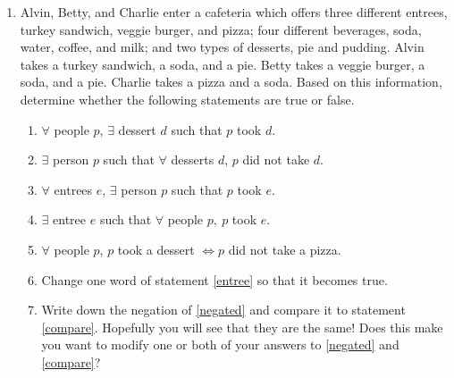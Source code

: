 \begin{enumerate}
\wbvfill

\workbookpagebreak

\item  Alvin, Betty, and Charlie enter a cafeteria which offers three different
entrees, turkey sandwich, veggie burger, and pizza; four different
beverages, soda, water, coffee, and milk; and two types of desserts,
pie and pudding.  Alvin takes a turkey sandwich, a soda, and a pie.
Betty takes a veggie burger, a soda, and a pie.  Charlie takes a pizza
and a soda.  Based on this information, determine whether the following
statements are true or false.

\begin{enumerate}
\item \label{negated} \wbitemsep $\forall$ people $p$, $\exists$ dessert $d$ such that $ p$
took $d$. 
\item \label{compare} \wbitemsep $\exists$ person $p$ such that $\forall$ desserts
$d$, $p$ did not take $d$. 
\item \wbitemsep $\forall$ entrees $e$, $\exists$ person $p$ such that $ p$ took
$e$. 
\item \label{entree} \wbitemsep $\exists$ entree $e$ such that  $\forall$ people
$p,\ p$ took $e$. 
\item \wbitemsep $\forall$ people $p$, $p$ took a dessert $\iff p$ did not take
a pizza. 
\item \wbitemsep Change one word of statement \ref{entree} so that it becomes true. 
\item \wbitemsep Write down the negation of \ref{negated} and compare it to statement
\ref{compare}.  Hopefully you will see that they are the same! Does
this make you want to modify one or both of your answers to \ref{negated}
and \ref{compare}? 
\end{enumerate}

\end{enumerate}
